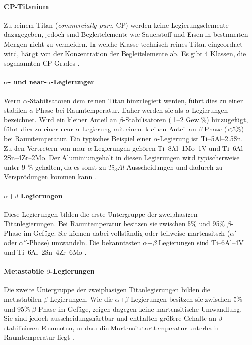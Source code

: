 \paragraph{CP-Titanium} 
Zu reinem Titan (\textit{commercially pure}, CP) werden keine Legierungselemente dazugegeben, jedoch sind Begleitelemente wie Sauerstoff und Eisen in bestimmten Mengen nicht zu vermeiden. In welche Klasse technisch reines Titan eingeordnet wird, hängt von der Konzentration der Begleitelemente ab. Es gibt 4 Klassen, die sogenannten CP-Grades \cite{C.Leyens.2005}.

\paragraph{$\alpha$- und near-$\alpha$-Legierungen}
Wenn $\alpha$-Stabilisatoren dem reinen Titan hinzulegiert werden, führt dies zu einer stabilen $\alpha$-Phase bei Raumtemperatur. Daher werden sie als $\alpha$-Legierungen bezeichnet. Wird ein kleiner Anteil an $\beta$-Stabilisatoren ( 1--2 Gew.\%) hinzugefügt, führt dies zu einer near-$\alpha$-Legierung mit einem kleinen Anteil an $\beta$-Phase (\textless5\%) bei Raumtemperatur. Ein typisches Beispiel einer $\alpha$-Legierung ist Ti–5Al–2.5Sn. Zu den Vertretern von near-$\alpha$-Legierungen gehören Ti–8Al–1Mo–1V und Ti–6Al–2Sn–4Zr–2Mo. Der Aluminiumgehalt in diesen Legierungen wird typischerweise unter 9 \% gehalten, da es sonst zu $Ti_{3}Al$-Ausscheidungen und dadurch zu Versprödungen kommen kann \cite{C.Leyens.2005,Lutjering.2007,Boyer.2007,M.J.Donachie.2010}.

\paragraph{$\alpha$+$\beta$-Legierungen}
Diese Legierungen bilden die erste Untergruppe der zweiphasigen Titanlegierungen. Bei Raumtemperatur besitzen sie zwischen 5\% und 95\% $\beta$-Phase im Gefüge. Sie können dabei vollständig oder teilweise martensitsch ($\alpha'$- oder $\alpha''$-Phase) umwandeln. Die bekanntesten $\alpha$+$\beta$ Legierungen sind Ti–6Al–4V und Ti–6Al–2Sn–4Zr–6Mo \cite{C.Leyens.2005,Lutjering.2007,Boyer.2007,M.J.Donachie.2010}.

\paragraph{Metastabile $\beta$-Legierungen}
Die zweite Untergruppe der zweiphasigen Titanlegierungen bilden die metastabilen $\beta$-Legierungen. Wie die $\alpha$+$\beta$-Legierungen besitzen sie zwischen 5\% und 95\% $\beta$-Phase im Gefüge, zeigen dagegen keine martensitische Umwandlung. Sie sind jedoch ausscheidungshärtbar und enthalten größere Gehalte an $\beta$-stabilisieren Elementen, so dass die Martensitstarttemperatur unterhalb Raumtemperatur liegt \cite{C.Leyens.2005,Lutjering.2007,Boyer.2007,M.J.Donachie.2010}. 

